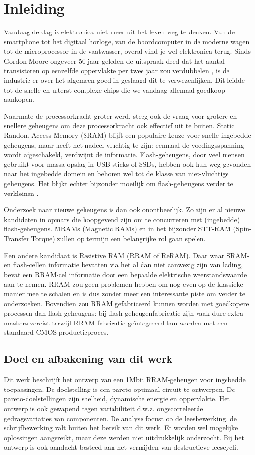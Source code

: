 \chapter{Inleiding}
\label{inleiding}

Vandaag de dag is elektronica niet meer uit het leven weg te denken. Van de smartphone tot het digitaal horloge, van de boordcomputer in de moderne wagen tot de microprocessor in de vaatwasser, overal vind je wel elektronica terug.
Sinds Gordon Moore ongeveer 50 jaar geleden de uitspraak deed dat het aantal transistoren op eenzelfde oppervlakte per twee jaar zou verdubbelen \cite{Moo65}, is de industrie er over het algemeen goed in geslaagd dit te verwezenlijken. Dit leidde tot de snelle en uiterst complexe chips die we vandaag allemaal goedkoop aankopen.

Naarmate de processorkracht groter werd, steeg ook de vraag voor grotere en snellere geheugens om deze processorkracht ook effectief uit te buiten. Static Random Access Memory (SRAM) blijft een populaire keuze voor snelle ingebedde geheugens, maar heeft het nadeel vluchtig te zijn: eenmaal de voedingsspanning wordt afgeschakeld, verdwijnt de informatie. Flash-geheugens, door veel mensen gebruikt voor massa-opslag in USB-sticks of SSDs, hebben ook hun weg gevonden naar het ingebedde domein en behoren wel tot de klasse van niet-vluchtige geheugens.
Het blijkt echter bijzonder moeilijk om flash-geheugens verder te verkleinen \cite{Pra10}.

Onderzoek naar nieuwe geheugens is dan ook onontbeerlijk. Zo zijn er al nieuwe kandidaten in opmars die hoopgevend zijn om te concurreren met (ingebedde) flash-geheugens. MRAMs (Magnetic RAMs) en in het bijzonder STT-RAM (Spin-Transfer Torque) zullen op termijn een belangrijke rol gaan spelen.

Een andere kandidaat is Resistive RAM (RRAM of ReRAM). Daar waar SRAM- en flash-cellen informatie bevatten via het al dan niet aanwezig zijn van lading, bevat een RRAM-cel informatie door een bepaalde elektrische weerstandswaarde aan te nemen. RRAM zou geen problemen hebben om nog even op de klassieke manier mee te schalen en is dus zonder meer een interessante piste om verder te onderzoeken. Bovendien zou RRAM gefabriceerd kunnen worden met goedkopere processen dan flash-geheugens: bij flash-geheugenfabricatie zijn vaak dure extra maskers vereist terwijl RRAM-fabricatie geïntegreerd kan worden met een standaard CMOS-productieproces.

\section{Doel en afbakening van dit werk}
Dit werk beschrijft het ontwerp van een 1Mbit RRAM-geheugen voor ingebedde toepassingen. De doelstelling is een pareto-optimaal circuit te ontwerpen. De pareto-doelstellingen zijn snelheid, dynamische energie en oppervlakte. Het ontwerp is ook gewapend tegen variabiliteit d.w.z. ongecorreleerde gedragsvariaties van componenten. De analyse focust op de leesbewerking, de schrijfbewerking valt buiten het bereik van dit werk. Er worden wel mogelijke oplossingen aangereikt, maar deze werden niet uitdrukkelijk onderzocht. Bij het ontwerp is ook aandacht besteed aan het vermijden van destructieve leescycli.

